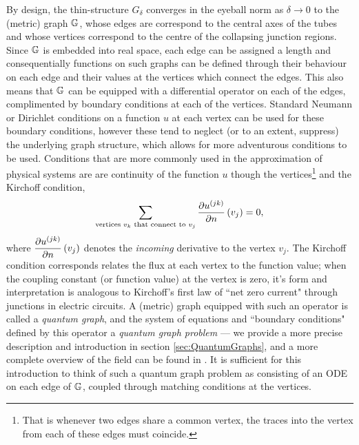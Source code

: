 By design, the thin-structure $G_{\delta}$ converges in the eyeball norm as $\delta\rightarrow0$ to the (metric) graph $\mathbb{G}$, whose edges are correspond to the central axes of the tubes and whose vertices correspond to the centre of the collapsing junction regions.
Since $\mathbb{G}$ is embedded into real space, each edge can be assigned a length and consequentially functions on such graphs can be defined through their behaviour on each edge and their values at the vertices which connect the edges.
This also means that $\mathbb{G}$ can be equipped with a differential operator on each of the edges, complimented by boundary conditions at each of the vertices.
Standard Neumann or Dirichlet conditions on a function $u$ at each vertex can be used for these boundary conditions, however these tend to neglect (or to an extent, suppress) the underlying graph structure, which allows for more adventurous conditions to be used.
Conditions that are more commonly used in the approximation of physical systems are are continuity of the function $u$ though the vertices\footnote{That is whenever two edges share a common vertex, the traces into the vertex from each of these edges must coincide.} and the Kirchoff condition,
\begin{align*}
	\sum_{\text{vertices } v_k \text{ that connect to } v_j} 
	\pdiff{u^{(jk)}}{n}\bracs{v_j} = 0, %
\end{align*}
where $\dfrac{\partial u^{(jk)}}{\partial n}\left( v_j \right)$ denotes the \emph{incoming} derivative to the vertex $v_j$. 
The Kirchoff condition corresponds relates the flux at each vertex to the function value; when the coupling constant (or function value) at the vertex is zero, it's form and interpretation is analogous to Kirchoff's first law of ``net zero current" through junctions in electric circuits.
A (metric) graph equipped with such an operator is called a \emph{quantum graph}, and the system of equations and ``boundary conditions" defined by this operator a \emph{quantum graph problem} --- we provide a more precise description and introduction in section \ref{sec:QuantumGraphs}, and a more complete overview of the field can be found in \cite{berkolaiko2013introduction}.
It is sufficient for this introduction to think of such a quantum graph problem as consisting of an ODE on each edge of $\mathbb{G}$, coupled through matching conditions at the vertices.

